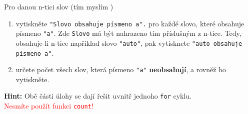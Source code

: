 \question[70]
Pro danou n-tici slov (tím myslím )
\begin{enumerate}[label=\alph*)]
	\item vytiskněte \texttt{"Slovo obsahuje písmeno a".} pro každé slovo, které
	      obsahuje písmeno \texttt{"a"}. Zde \texttt{Slovo} má být nahrazeno tím
	      příslušným z n-tice. Tedy, obsahuje-li n-tice například slovo
	      \texttt{"auto"}, pak vytisknete \texttt{"auto obsahuje písmeno a"}.
	\item určete počet všech slov, která písmeno \texttt{"a"}
	      \textbf{neobsahují}, a rovněž ho vytiskněte.
\end{enumerate}
\textbf{Hint:} Obě části úlohy se dají řešit uvnitř jednoho \texttt{for}
cyklu.\\
\textcolor{red}{Nesmíte použít funkci \texttt{count}!}
